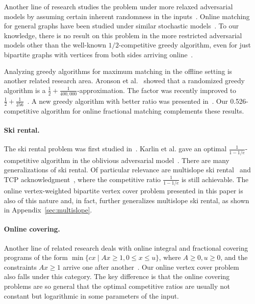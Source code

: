 \documentclass{article}
\begin{document}
Another line of research studies the problem under more relaxed adversarial models by assuming certain inherent randomness in the inputs~\cite{Feldman2009,Manshadi2011,Mahdian2011, Karande2011}. Online matching for general graphs have been studied under similar stochastic models~\cite{bansal2010lp}. To our knowledge, there is no result on this problem in the more restricted adversarial models other than the well-known $1/2$-competitive greedy algorithm, even for just bipartite graphs with vertices from both sides arriving online~\cite{Blum2006}.

Analyzing greedy algorithms for maximum matching in the offline setting is another related research area. Aronson et al.~\cite{Aronson1995} showed that a randomized greedy algorithm is a $\frac{1}{2}+\frac{1}{400,000}$-approximation. The factor was recently improved to $\frac{1}{2}+\frac{1}{256}$~\cite{poloczek12}. A new greedy algorithm with better ratio was presented in~\cite{goel12}. Our 0.526-competitive algorithm for online fractional matching complements these results. 

\paragraph{Ski rental.} The ski rental problem was first studied in~\cite{karlin1988competitive}. Karlin et al. gave an optimal $\frac{1}{1-1/e}$-competitive algorithm in the oblivious adversarial model~\cite{Karlin1994}. There are many generalizations of ski rental. Of particular relevance are multislope ski rental~\cite{Lotker2008}  and TCP acknowledgment~\cite{Karlin2001}, where the competitive ratio $\frac{1}{1-1/e}$ is still achievable. 
The online vertex-weighted bipartite vertex cover problem presented in this paper is also of this nature and, in fact, further generalizes multislope ski rental, as shown in Appendix~\ref{sec:multislope}.

\paragraph{Online covering.} Another line of related research deals with online integral and fractional covering programs of the form $\min\{ cx\mid Ax\geq 1,0\leq x\leq u\}$, where $A\geq 0,u\geq 0$, and the constraints $Ax\geq 1$ arrive one after another~\cite{Buchbinder2009}. Our online vertex cover problem also falls under this category. The key difference is that the online covering problems are so general that the optimal competitive ratios are usually not constant but logarithmic in some parameters of the input.
\end{document}
